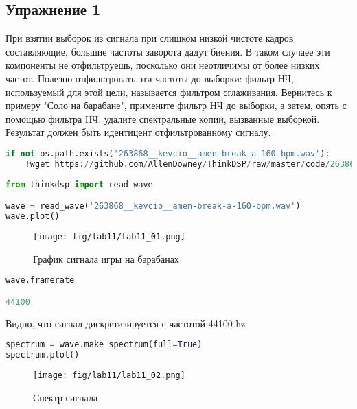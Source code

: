 \subsection{Упражнение 1}

При взятии выборок из сигнала при слишком низкой чистоте кадров составляющие, большие частоты заворота дадут биения. В таком случаее эти компоненты не отфильтруешь, посколько они неотличимы от более низких частот. Полезно отфильтровать эти частоты до выборки: фильтр НЧ, используемый для этой цели, называется фильтром сглаживания. Вернитесь к примеру "Соло на барабане", примените фильтр НЧ до выборки, а затем, опять с помощью фильтра НЧ, удалите спектральные копии, вызванные выборкой. Результат должен быть идентицент отфильтрованному сигналу.

\begin{lstlisting}[language=Python]
if not os.path.exists('263868__kevcio__amen-break-a-160-bpm.wav'):
    !wget https://github.com/AllenDowney/ThinkDSP/raw/master/code/263868__kevcio__amen-break-a-160-bpm.wav
    
from thinkdsp import read_wave

wave = read_wave('263868__kevcio__amen-break-a-160-bpm.wav')
wave.plot()
\end{lstlisting}

\begin{figure}[H]
	\begin{center}
		\texttt{[image: fig/lab11/lab11\_01.png]}
		\caption{График сигнала игры на барабанах}
	\end{center}
\end{figure}

\begin{lstlisting}[language=Python]
wave.framerate

44100
\end{lstlisting}

Видно, что сигнал дискретизируется с частотой 44100 hz

\begin{lstlisting}[language=Python]
spectrum = wave.make_spectrum(full=True)
spectrum.plot()
\end{lstlisting}

\begin{figure}[H]
	\begin{center}
		\texttt{[image: fig/lab11/lab11\_02.png]}
		\caption{Спектр сигнала}
	\end{center}
\end{figure}

